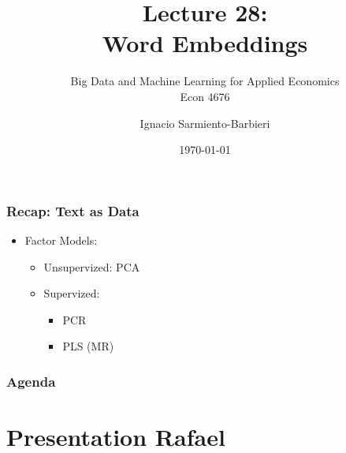 \documentclass[
  shownotes,
  xcolor={svgnames},
  hyperref={colorlinks,citecolor=DarkBlue,linkcolor=DarkRed,urlcolor=DarkBlue}
  , aspectratio=169]{beamer}
\begin{document}
\title[Lecture 28]{Lecture 28: \\ Word  Embeddings}
\subtitle{Big Data and Machine Learning for Applied Economics \\ Econ 4676}
\date{\today}

\author[Sarmiento-Barbieri]{Ignacio Sarmiento-Barbieri}


\begin{frame}[noframenumbering]
\maketitle
\end{frame}






\begin{frame}
\frametitle{Recap: Text as Data}

\begin{itemize} 
  
\item Factor Models:
\medskip
\begin{itemize}
  \item Unsupervized: PCA 
\medskip 
  \item Supervized: 
  \begin{itemize}
    \item PCR
    \medskip
    \item PLS (MR)
  \end{itemize}
\end{itemize}


\end{itemize}
  
\end{frame}


\begin{frame}
\frametitle{Agenda}

\tableofcontents

\end{frame}
\section{Presentation Rafael }
\end{document}
